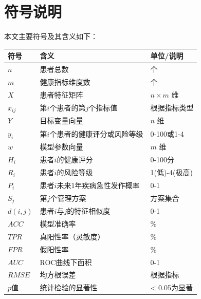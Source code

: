 
\section{符号说明}

本文主要符号及其含义如下：

\begin{longtable}[]{@{}lll@{}}
\toprule
\textbf{符号} & \textbf{含义} & \textbf{单位/说明} \\
\midrule
\endhead

$n$ & 患者总数 & 个 \\

$m$ & 健康指标维度数 & 个 \\

$X$ & 患者特征矩阵 & $n \times m$ 维 \\

$x_{ij}$ & 第$i$个患者的第$j$个指标值 & 根据指标类型 \\

$Y$ & 目标变量向量 & $n$ 维 \\

$y_i$ & 第$i$个患者的健康评分或风险等级 & 0-100或1-4 \\

$w$ & 模型参数向量 & $m$ 维 \\

$H_i$ & 患者$i$的健康评分 & 0-100分 \\

$R_i$ & 患者$i$的风险等级 & 1(低)-4(极高) \\

$P_i$ & 患者$i$未来1年疾病急性发作概率 & 0-1 \\

$S_j$ & 第$j$个管理方案 & 方案集合 \\

$d(i,j)$ & 患者$i$与$j$的特征相似度 & 0-1 \\

$ACC$ & 模型准确率 & \% \\

$TPR$ & 真阳性率（灵敏度） & \% \\

$FPR$ & 假阳性率 & \% \\

$AUC$ & ROC曲线下面积 & 0-1 \\

$RMSE$ & 均方根误差 & 根据指标 \\

$p$值 & 统计检验的显著性 & < 0.05为显著 \\

\bottomrule
\end{longtable}

